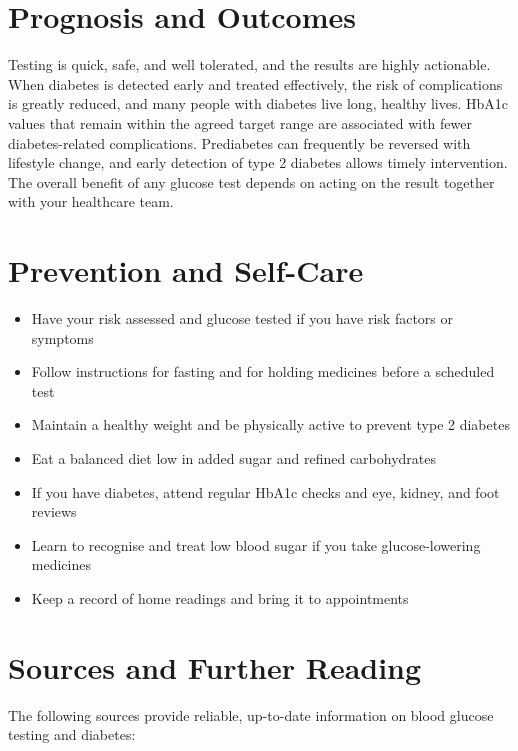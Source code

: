 \section*{Prognosis and Outcomes}
Testing is quick, safe, and well tolerated, and the results are highly actionable. When diabetes is detected early and treated effectively, the risk of complications is greatly reduced, and many people with diabetes live long, healthy lives. HbA1c values that remain within the agreed target range are associated with fewer diabetes-related complications. Prediabetes can frequently be reversed with lifestyle change, and early detection of type 2 diabetes allows timely intervention. The overall benefit of any glucose test depends on acting on the result together with your healthcare team.

\section*{Prevention and Self-Care}
\begin{itemize}
    \item Have your risk assessed and glucose tested if you have risk factors or symptoms
    \item Follow instructions for fasting and for holding medicines before a scheduled test
    \item Maintain a healthy weight and be physically active to prevent type 2 diabetes
    \item Eat a balanced diet low in added sugar and refined carbohydrates
    \item If you have diabetes, attend regular HbA1c checks and eye, kidney, and foot reviews
    \item Learn to recognise and treat low blood sugar if you take glucose-lowering medicines
    \item Keep a record of home readings and bring it to appointments
\end{itemize}

\section*{Sources and Further Reading}
The following sources provide reliable, up-to-date information on blood glucose testing and diabetes:


